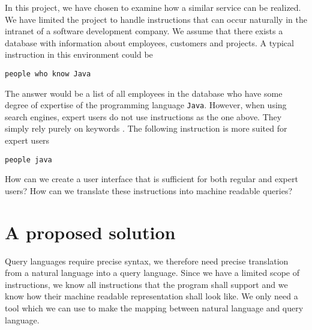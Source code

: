 In this project, we have chosen to examine how a similar service can be realized. We have limited the project to handle instructions that can occur naturally in the intranet of a software development company. We assume that there exists a database with information about employees, customers and projects. A typical instruction in this environment could be

\begin{verbatim}
people who know Java
\end{verbatim}

The answer would be a list of all employees in the database who have some degree of expertise of the programming language \texttt{Java}. However, when using search engines, expert users do not use instructions as the one above. They simply rely purely on keywords \cite{mayer:2007}. The following instruction is more suited for expert users

\begin{verbatim}
people java
\end{verbatim}

How can we create a user interface that is sufficient for both regular and expert users? How can we translate these instructions into machine readable queries?

\section{A proposed solution}
Query languages require precise syntax, we therefore need precise translation from a natural language into a query language. Since we have a limited scope of instructions, we know all instructions that the program shall support and we know how their machine readable representation shall look like. We only need a tool which we can use to make the mapping between natural language and query language. 

